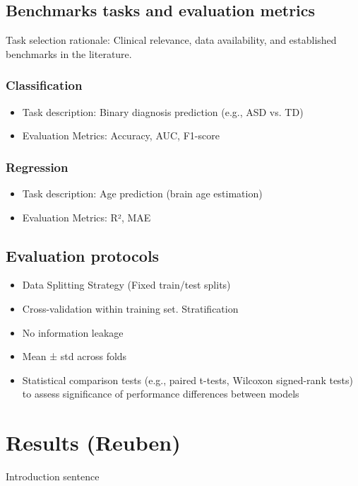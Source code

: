 \subsection{Benchmarks tasks and evaluation metrics}
Task selection rationale: Clinical relevance, data availability, and established benchmarks in the literature.

\subsubsection{Classification} 
\begin{itemize}
    \item Task description: Binary diagnosis prediction (e.g., ASD vs. TD)
    \item Evaluation Metrics: Accuracy, AUC, F1-score
\end{itemize}

\subsubsection{Regression} 
\begin{itemize}
    \item Task description: Age prediction (brain age estimation)
    \item Evaluation Metrics: R², MAE
\end{itemize}

\subsection{Evaluation protocols}

\begin{itemize}
    \item Data Splitting Strategy (Fixed train/test splits)
    \item Cross-validation within training set. Stratification
    \item No information leakage
    \item Mean ± std across folds
    \item Statistical comparison tests (e.g., paired t-tests, Wilcoxon signed-rank tests) to assess significance of performance differences between models
\end{itemize}


\section{Results (Reuben)}
Introduction sentence


